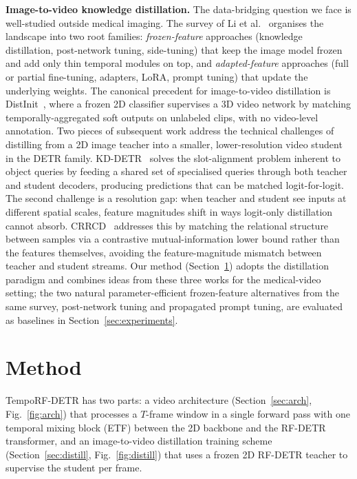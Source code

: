 \documentclass[conference]{IEEEtran}
\begin{document}
\textbf{Image-to-video knowledge distillation.} The data-bridging question we face is well-studied outside medical imaging. The survey of Li et al.~\cite{li2025imagetovideo} organises the landscape into two root families: \emph{frozen-feature} approaches (knowledge distillation, post-network tuning, side-tuning) that keep the image model frozen and add only thin temporal modules on top, and \emph{adapted-feature} approaches (full or partial fine-tuning, adapters, LoRA, prompt tuning) that update the underlying weights. The canonical precedent for image-to-video distillation is DistInit~\cite{girdhar2019distinit}, where a frozen 2D classifier supervises a 3D video network by matching temporally-aggregated soft outputs on unlabeled clips, with no video-level annotation. Two pieces of subsequent work address the technical challenges of distilling from a 2D image teacher into a smaller, lower-resolution video student in the DETR family. KD-DETR~\cite{wang2024kddetr} solves the slot-alignment problem inherent to object queries by feeding a shared set of specialised queries through both teacher and student decoders, producing predictions that can be matched logit-for-logit. The second challenge is a resolution gap: when teacher and student see inputs at different spatial scales, feature magnitudes shift in ways logit-only distillation cannot absorb. CRRCD~\cite{zhang2024crrcd} addresses this by matching the relational structure between samples via a contrastive mutual-information lower bound rather than the features themselves, avoiding the feature-magnitude mismatch between teacher and student streams. Our method (Section~\ref{sec:method}) adopts the distillation paradigm and combines ideas from these three works for the medical-video setting; the two natural parameter-efficient frozen-feature alternatives from the same survey, post-network tuning and propagated prompt tuning, are evaluated as baselines in Section~\ref{sec:experiments}.

\section{Method}
\label{sec:method}

TempoRF-DETR has two parts: a video architecture (Section~\ref{sec:arch}, Fig.~\ref{fig:arch}) that processes a $T$-frame window in a single forward pass with one temporal mixing block (ETF) between the 2D backbone and the RF-DETR transformer, and an image-to-video distillation training scheme (Section~\ref{sec:distill}, Fig.~\ref{fig:distill}) that uses a frozen 2D RF-DETR teacher to supervise the student per frame.
\end{document}
